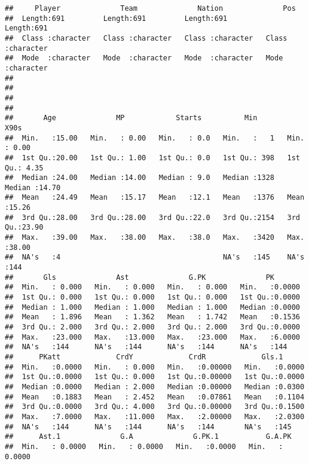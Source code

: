 \documentclass[
]{article}
\begin{document}
\begin{verbatim}
##     Player              Team              Nation              Pos           
##  Length:691         Length:691         Length:691         Length:691        
##  Class :character   Class :character   Class :character   Class :character  
##  Mode  :character   Mode  :character   Mode  :character   Mode  :character  
##                                                                             
##                                                                             
##                                                                             
##                                                                             
##       Age              MP            Starts          Min            X90s      
##  Min.   :15.00   Min.   : 0.00   Min.   : 0.0   Min.   :   1   Min.   : 0.00  
##  1st Qu.:20.00   1st Qu.: 1.00   1st Qu.: 0.0   1st Qu.: 398   1st Qu.: 4.35  
##  Median :24.00   Median :14.00   Median : 9.0   Median :1328   Median :14.70  
##  Mean   :24.49   Mean   :15.17   Mean   :12.1   Mean   :1376   Mean   :15.26  
##  3rd Qu.:28.00   3rd Qu.:28.00   3rd Qu.:22.0   3rd Qu.:2154   3rd Qu.:23.90  
##  Max.   :39.00   Max.   :38.00   Max.   :38.0   Max.   :3420   Max.   :38.00  
##  NA's   :4                                      NA's   :145    NA's   :144    
##       Gls              Ast              G.PK              PK        
##  Min.   : 0.000   Min.   : 0.000   Min.   : 0.000   Min.   :0.0000  
##  1st Qu.: 0.000   1st Qu.: 0.000   1st Qu.: 0.000   1st Qu.:0.0000  
##  Median : 1.000   Median : 1.000   Median : 1.000   Median :0.0000  
##  Mean   : 1.896   Mean   : 1.362   Mean   : 1.742   Mean   :0.1536  
##  3rd Qu.: 2.000   3rd Qu.: 2.000   3rd Qu.: 2.000   3rd Qu.:0.0000  
##  Max.   :23.000   Max.   :13.000   Max.   :23.000   Max.   :6.0000  
##  NA's   :144      NA's   :144      NA's   :144      NA's   :144     
##      PKatt             CrdY             CrdR             Gls.1       
##  Min.   :0.0000   Min.   : 0.000   Min.   :0.00000   Min.   :0.0000  
##  1st Qu.:0.0000   1st Qu.: 0.000   1st Qu.:0.00000   1st Qu.:0.0000  
##  Median :0.0000   Median : 2.000   Median :0.00000   Median :0.0300  
##  Mean   :0.1883   Mean   : 2.452   Mean   :0.07861   Mean   :0.1104  
##  3rd Qu.:0.0000   3rd Qu.: 4.000   3rd Qu.:0.00000   3rd Qu.:0.1500  
##  Max.   :7.0000   Max.   :11.000   Max.   :2.00000   Max.   :2.0300  
##  NA's   :144      NA's   :144      NA's   :144       NA's   :145     
##      Ast.1              G.A              G.PK.1           G.A.PK       
##  Min.   : 0.0000   Min.   : 0.0000   Min.   :0.0000   Min.   : 0.0000  

\end{verbatim}
\end{document}
